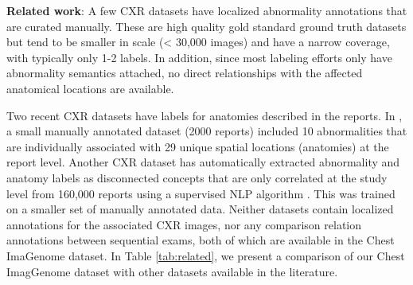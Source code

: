 \textbf{Related work}:
A few CXR datasets have localized abnormality annotations \cite{shih2019augmenting,filice2020crowdsourcing,jaeger2014two} that are curated manually. These are high quality gold standard ground truth datasets but tend to be smaller in scale (< 30,000 images) and have a narrow coverage, with typically only 1-2 labels. In addition, since most labeling efforts only have abnormality semantics attached, no direct relationships with the affected anatomical locations are available. 



Two recent CXR datasets have labels for anatomies described in the reports. In \cite{datta2020dataset}, a small manually annotated dataset (2000 reports) included 10 abnormalities that are individually associated with 29 unique spatial locations (anatomies) at the report level. Another CXR dataset has automatically extracted abnormality and anatomy labels as disconnected concepts that are only correlated at the study level from  160,000 reports using a supervised NLP algorithm \cite{bustos2020padchest}. This was trained on a smaller set of manually annotated data. Neither datasets contain localized annotations for the associated CXR images, nor any comparison relation annotations between sequential exams, both of which are available in the Chest ImaGenome dataset. In Table \ref{tab:related}, we present a comparison of our Chest ImagGenome dataset with other datasets available in the literature.




